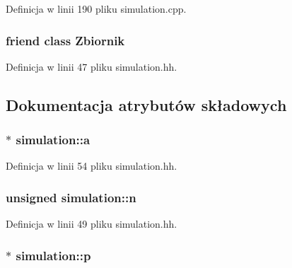 Definicja w linii 190 pliku simulation.\+cpp.

\hypertarget{classsimulation_a444a8643309d19294860a4ae144137fe}{}
\subsubsection[{Zbiornik}]{\setlength{\rightskip}{0pt plus 5cm}friend class {\bf Zbiornik}\hspace{0.3cm}{\ttfamily [friend]}}\label{classsimulation_a444a8643309d19294860a4ae144137fe}


Definicja w linii 47 pliku simulation.\+hh.



\subsection{Dokumentacja atrybutów składowych}
\hypertarget{classsimulation_a7b5ca0e5fc096989be7966a73c360b7f}{}
\subsubsection[{a}]{$\ast$ simulation\+::a\hspace{0.3cm}{\ttfamily [private]}}\label{classsimulation_a7b5ca0e5fc096989be7966a73c360b7f}


Definicja w linii 54 pliku simulation.\+hh.

\hypertarget{classsimulation_a22eb97765a5c60adf3d995f7a110da70}{}
\subsubsection[{n}]{\setlength{\rightskip}{0pt plus 5cm}unsigned simulation\+::n\hspace{0.3cm}{\ttfamily [private]}}\label{classsimulation_a22eb97765a5c60adf3d995f7a110da70}


Definicja w linii 49 pliku simulation.\+hh.

\hypertarget{classsimulation_a5412fd01febe99f12ae38e30eb692ff0}{}
\subsubsection[{p}]{$\ast$ simulation\+::p\hspace{0.3cm}{\ttfamily [private]}}\label{classsimulation_a5412fd01febe99f12ae38e30eb692ff0}


